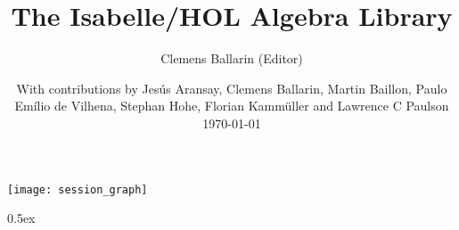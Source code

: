\documentclass[11pt,a4paper]{article}
\begin{document}
\title{The Isabelle/HOL Algebra Library}
\author{Clemens Ballarin (Editor)}
\date{With contributions by Jesús Aransay, Clemens Ballarin, Martin Baillon, Paulo Emílio de Vilhena, Stephan Hohe,
  Florian Kammüller and Lawrence C Paulson \\
  \today}
\maketitle

\tableofcontents

\begin{center}
  \texttt{[image: session\_graph]}
\end{center}

\clearpage

\parindent 0pt\parskip 0.5ex


\pagestyle{headings}


\end{document}
